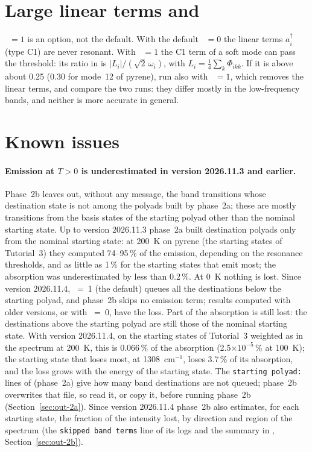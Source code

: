 \section*{Large linear terms and }

~$=1$ is an option, not the default. With the default
~$=0$ the linear terms $a^\dagger_i$ (type C1) are
never resonant. With ~$=1$ the C1 term of a soft
mode can pass the threshold: its ratio in  is
$|L_i|/(\sqrt2\,\omega_i)$, with $L_i=\frac14\sum_k\Phi_{ikk}$. If it is
above about 0.25 (0.30 for mode~12 of pyrene), run also with
~$=1$, which removes the linear terms, and compare the
two runs: they differ mostly in the low-frequency bands, and neither is
more accurate in general.

\section*{Known issues}

\paragraph{Emission at $T>0$ is underestimated in version 2026.11.3 and earlier.} Phase~2b leaves out,
without any message, the band transitions whose destination state is not
among the polyads built by phase~2a; these are mostly transitions from
the basis states of the starting polyad other than the nominal starting
state. Up to version 2026.11.3 phase~2a built destination polyads only
from the nominal starting state: at 200~K on pyrene (the starting states
of Tutorial~3) they computed 74--95\,\% of the emission, depending on
the resonance thresholds, and as little as 1\,\% for the starting states
that emit most; the absorption was underestimated by less than 0.2\,\%. At
0~K nothing is lost. Since version 2026.11.4, ~=~1
(the default) queues all the destinations below the starting polyad, and
phase~2b skips no emission term; results computed with older versions, or with
~=~0, have the loss. Part of the absorption is
still lost: the destinations above the starting polyad are still those of
the nominal starting state. With version 2026.11.4, on the starting states
of Tutorial~3 weighted as in the spectrum at 200~K, this is 0.066\,\% of
the absorption (2.5$\times10^{-5}$\,\% at 100~K); the starting state that
loses most, at 1308~cm$^{-1}$, loses 3.7\,\% of its absorption, and the
loss grows with the energy of the starting state. The
\texttt{starting polyad:} lines of  (phase~2a) give how
many band destinations are not queued; phase~2b overwrites that file, so
read it, or copy it, before running phase~2b (Section~\ref{sec:out-2a}). Since version 2026.11.4 phase~2b also
estimates, for each starting state, the fraction of the intensity lost, by
direction and region of the spectrum (the \texttt{skipped band terms} line of
its logs and the summary in , Section~\ref{sec:out-2b}).
